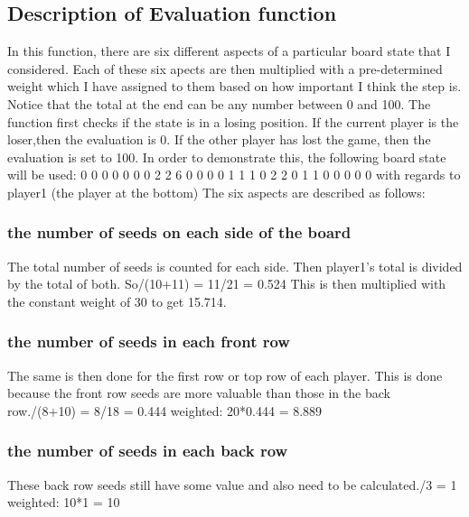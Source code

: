 \documentclass[a4paper]{article}
\begin{document}
	\subsection{Description of Evaluation function}
	In this function, there are six different aspects of a particular board state that I considered. Each of these six 
	apects are then multiplied with a pre-determined weight which I have assigned to them based on how important I think the 			step is.  Notice that the total at the end can be any number between 0 and 100. The function first checks if the state is in 	a losing position. If the current player is the loser,then the evaluation is 0. If the other player has lost the game, then 		the evaluation is set to 100. In order to demonstrate this, the following board state will be used:
	\newline
	 0 0 0 0 0 0 0 2 2 6 0 0 0 0 1 1 1 0 2 2 0 1 1 0 0 0 0 0\newline
	with regards to player1	(the player at the bottom)
	\newline
	\newline
	The six aspects are described as follows:
	\subsubsection{the number of seeds on each side of the board}
	The total number of seeds is counted for each side. Then player1's total is divided by the total of both. So/(10+11) = 11/21 = 0.524 \newline This is then multiplied with the constant weight of 30 to get 15.714.
	\subsubsection{the number of seeds in each front row}
	The same is then done for the first row or top row of each player. This is done because the front row seeds are more 
	valuable than those in the back row./(8+10) = 8/18 = 0.444\newline
	weighted: 20*0.444 = 8.889
	\subsubsection{the number of seeds in each back row}
	These back row seeds still have some value and also need to be calculated./3 = 1\newline
	weighted: 10*1 = 10
\end{document}
